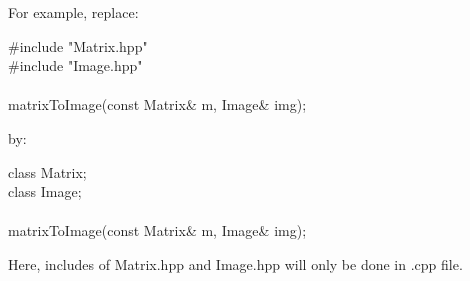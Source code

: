 For example, replace:
\begin{algorithm}[H]
\#include "Matrix.hpp" \\
\#include "Image.hpp" \\
 \\
matrixToImage(const Matrix\& m, Image\& img);
\end{algorithm}

by:
\begin{algorithm}[H]
class Matrix; \\
class Image; \\
 \\
matrixToImage(const Matrix\& m, Image\& img);
\end{algorithm}

Here, includes of Matrix.hpp and Image.hpp will only be done in .cpp file.
